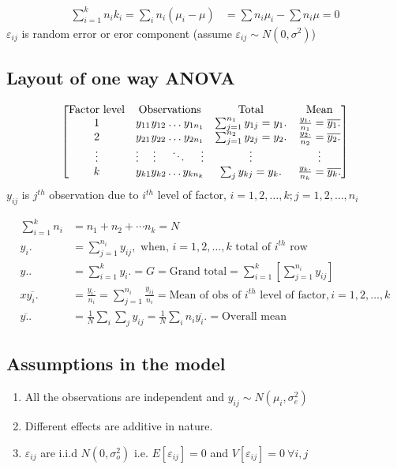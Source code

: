 \documentclass[oneside,11pt,pdftex]{book}%
\numberwithin{equation}{section}
\numberwithin{section}{chapter}
\numberwithin{equation}{chapter}
\begin{document}
 
 \begin{align*}
  \sum_{i=1}^k n_i k_i = \sum_{i} n_i (\mu_i-\mu) &= \sum n_i\mu_i - \sum n_i\mu = 0
 \end{align*}
 $ \varepsilon_{ij}$ is random error or eror component (assume $ \varepsilon_{ij} \sim N(0, \sigma^2) $)

\subsection{Layout of one way ANOVA}
\[
\begin{bmatrix} 
	\text{Factor level} & \text{Observations} & \text{Total} & \text{Mean} \\
	1 & y_{11} \hfill y_{12} \hfill \dots \hfill y_{1n_1} & \sum_{j=1}^{n_1}y_{1j}=y_1. & \frac{y_1.}{n_1}=\overline{y_{1}.}\\
	2 & y_{21} \hfill y_{22} \hfill \dots \hfill y_{2n_1} & \sum_{j=1}^{n_2}y_{2j}=y_2. & \frac{y_2.}{n_2}=\overline{y_{2}.}\\
	\vdots & \vdots \hfill \vdots \hfill \ddots \hfill \vdots & \vdots & \vdots \\
	k & y_{k1} \hfill y_{k2} \hfill \dots \hfill y_{kn_{k}} & \sum_j y_{kj}=y_k. & \frac{y_k .}{n_k}=\overline{y_{k}.}
\end{bmatrix}
\]
$ y_{ij} $ is $ j^{th} $ observation due to $ i^{th} $ level of factor, $ i=1,2,\dots, k; j=1,2,\dots,n_i $

\begin{align*}
	\sum_{i=1}^k n_i&=n_1+n_2+\cdots n_k = N\\
	y_i.&= \sum_{j=1}^{n_i} y_{ij}, \text{ when, } i=1,2,\dots,k \text{ total of $i^{th}$ row}\\
	y..&= \sum_{i=1}^{k} y_i. = G = \text{Grand total}= \sum_{i=1}^k \left[ \sum_{j=1}^{n_i} y_{ij} \right]\\
	x \overline{y_i.}&= \frac{y_i.}{n_i}=\sum_{j=1}^{n_i}\frac{y_{ij}}{n_i}= \text{Mean of obs of $i^{th}$ level of factor}, i=1,2, \dots, k\\
	\overline{y..}&=\frac{1}{N}\sum_i \sum_j y_{ij}=\frac{1}{N} \sum_i n_i \overline{y_i.}=\text{Overall mean}
\end{align*}

\subsection{Assumptions in the model}
\begin{enumerate}
	\item All the observations are independent and $ y_{ij} \sim N(\mu_i, \sigma_e ^2) $
	\item Different effects are additive in nature.
	\item $ \varepsilon_{ij} $ are i.i.d $ N(0, \sigma_o^2) $ i.e. $ E[\varepsilon_{ij}] =0$ and $ V[\varepsilon_{ij}] =0\ \forall i, j$
\end{enumerate}
\end{document}
